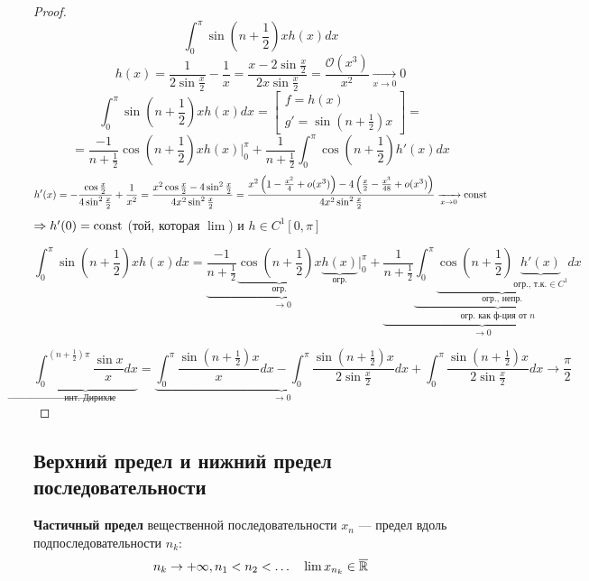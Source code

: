 \begin{proof}
    $$\int_0^\pi \sin\left(n+\frac{1}{2}\right)x h(x)dx$$
    $$h(x)=\frac{1}{2\sin\frac{x}{2}}-\frac{1}{x}=\frac{x-2\sin\frac{x}{2}}{2x\sin\frac{x}{2}}=\frac{\mathcal O(x^3)}{x^2}\xrightarrow[x\to0]{}0$$
    $$\int_0^\pi \sin\left(n+\frac{1}{2}\right)x h(x)dx = \left[\begin{array}{ll}
        f = h(x) \\
        g' = \sin\left(n+\frac{1}{2}\right)x
    \end{array}\right]=$$
    $$=\frac{-1}{n+\frac{1}{2}}\cos\left(n+\frac{1}{2}\right)x h(x)\Big|_0^\pi + \frac{1}{n+\frac{1}{2}}\int_0^\pi \cos\left(n+\frac{1}{2}\right) h'(x)dx$$
    $$h'(x) = -\frac{\cos\frac{x}{2}}{4\sin^2\frac{x}{2}}+\frac{1}{x^2}=\frac{x^2\cos\frac{x}{2} - 4\sin^2 \frac{x}{2}}{4x^2\sin^2\frac{x}{2}} = \frac{x^2\left(1-\frac{x^2}{4}+o(x^3)\right) - 4\left(\frac{x}{2}-\frac{x^3}{48}+o(x^3)\right)}{4x^2\sin^2\frac{x}{2}}\xrightarrow[x\to0]{} \text{const}$$
    $\Rightarrow h'(0)=\text{const}$ (той, которая $\lim$) и $h\in C^1[0,\pi]$

    $$\int_0^\pi \sin\left(n+\frac{1}{2}\right)x h(x)dx=\underbrace{\frac{-1}{n+\frac{1}{2}}\underbrace{\cos\left(n+\frac{1}{2}\right)x}_{\text{огр.}} \underbrace{h(x)}_{\text{огр.}}}_{\to0}\Big|_0^\pi + \underbrace{\frac{1}{n+\frac{1}{2}}\underbrace{\int_0^\pi \underbrace{\cos\left(n+\frac{1}{2}\right) \underbrace{h'(x)}_{\text{огр., т.к.}\in C^1}}_{\text{огр., непр.}}dx}_{\text{огр. как ф-ция от } n}}_{\to0}$$

    $$\underbrace{\int_0^{\left(n+\frac{1}{2}\right)\pi} \frac{\sin x}{x}dx}_{\to\text{инт. Дирихле}} = \underbrace{\int_0^\pi \frac{\sin\left(n+\frac{1}{2}\right)x}{x}dx - \int_0^\pi \frac{\sin\left(n+\frac{1}{2}\right)x}{2\sin\frac{x}{2}}dx}_{\to0} + \int_0^\pi \frac{\sin\left(n+\frac{1}{2}\right)x}{2\sin\frac{x}{2}}dx\to\frac{\pi}{2}$$
\end{proof}

\subsection*{Верхний предел и нижний предел последовательности}

\begin{definition}
    \textbf{Частичный предел} вещественной последовательности $x_n$ --- предел вдоль подпоследовательности $n_k$:
    $$n_k\to+\infty, n_1<n_2<\ldots \quad \lim x_{n_k}\in\overline{\mathbb{R}}$$
\end{definition}

